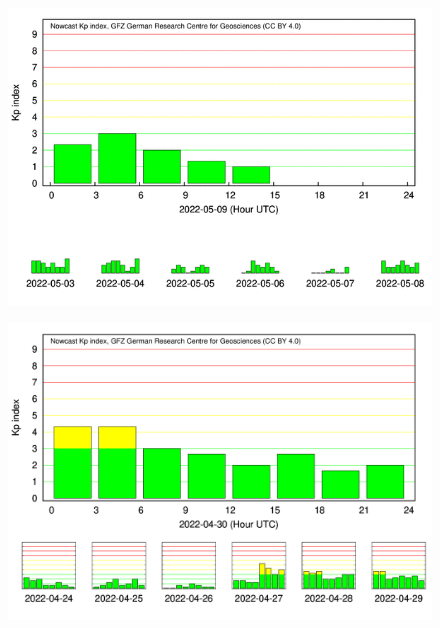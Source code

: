 \documentclass[a4paper, 10pt]{article}
\begin{document}
                     \begin{figure}[H]
    
                        \centering
   
                             \includegraphics[width=14cm]{./figures//figureGeomag_6.png}

                        \end{figure}

                     \begin{figure}[H]
    
                        \centering
   
                             \includegraphics[width=14cm]{./figures//figureGeomag_7.png}

                        \end{figure}
\end{document}
